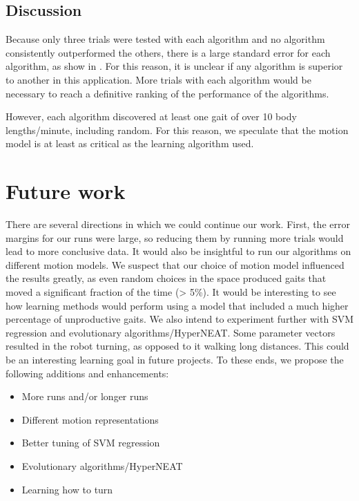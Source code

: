 \subsection{Discussion}

Because only three trials were tested with each algorithm and no
algorithm consistently outperformed the others, there is a large
standard error for each algorithm, as show in . For
this reason, it is unclear if any algorithm is superior to another in
this application. More trials with each algorithm would be necessary
to reach a definitive ranking of the performance of the algorithms.

However, each algorithm discovered at least one gait of over 10 body
lengths/minute, including random. For this reason, we speculate that
the motion model is at least as critical as the learning algorithm
used.



\section{Future work}

There are several directions in which we could continue our
work. First, the error margins for our runs were large, so reducing
them by running more trials would lead to more conclusive data. It
would also be insightful to run our algorithms on different motion
models.  We suspect that our choice of motion model influenced the
results greatly, as even random choices in the space produced gaits
that moved a significant fraction of the time (> 5\%).  It would be
interesting to see how learning methods would perform using a model
that included a much higher percentage of unproductive gaits. We also
intend to experiment further with SVM regression and evolutionary
algorithms/HyperNEAT.  Some parameter vectors resulted in the robot
turning, as opposed to it walking long distances. This could be an
interesting learning goal in future projects. To these ends, we
propose the following additions and enhancements:

\begin{itemize}
\item More runs and/or longer runs
\item Different motion representations
\item Better tuning of SVM regression
\item Evolutionary algorithms/HyperNEAT\cite{clune}
\item Learning how to turn
\end{itemize}



